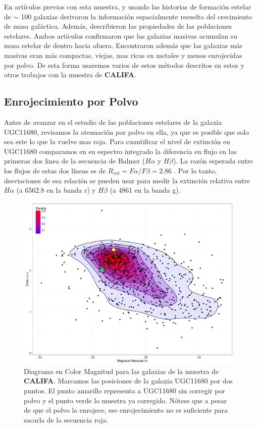 \noindent En artículos previos con esta muestra, y usando las historias de formación estelar de $\sim$ 100 galaxias \citep{perez2013} derivaron la información espacialmente resuelta del crecimiento de masa galáctica. Además, \citep{gonzalez2014} describieron  las propiedades de las poblaciones estelares. Ambos artículos confirmaron que las galaxias masivas acumulan su masa estelar de dentro hacia afuera. Encontraron además que las galaxias más masivas eran más compactas, viejas, mas ricas en metales y menos enrojecidas por polvo.
De esta forma usaremos varios de estos métodos descritos en estos y otros trabajos con la muestra de \textbf{CALIFA}.

\subsection{Enrojecimiento por Polvo}

Antes de avanzar en el estudio de las poblaciones estelares de la galaxia UGC11680,
revisamos la atenuación por polvo en ella, ya que es posible
que solo sea este lo que la vuelve mas roja. Para cuantificar el nivel de
extinción en UGC11680 comparamos en su espectro integrado la diferencia en flujo en las primeras dos
linea de la secuencia de Balmer ($H\alpha$ y $H\beta$). La razón esperada entre los flujos de estas dos líneas
es de $R_{int}=F\alpha/F\beta=2.86$ \citep{osterbrock1989}. Por lo tanto, desviaciones de esa relación se pueden usar para medir
la extinción relativa entre $H\alpha$ (a 6562.8 \text{\AA} en la banda r) y $H\beta$ (a 4861 \text{\AA} en la banda g).

\begin{figure}
  \centering
    \includegraphics[scale=0.5]{color_magnitud_ur.pdf}
  \caption[Diagrama Color-Magnitud con UGC11680]{Diagrama en Color Magnitud para las galaxias de la muestra de  \textbf{CALIFA}. Marcamos las posiciones de la galaxia UGC11680 por dos puntos. El punto amarillo representa a UGC11680 sin corregir por polvo y el punto verde lo muestra ya corregido. Nótese que a pesar de que el polvo la enrojece, ese enrojecimiento no es suficiente para sacarla de la secuencia roja.}
  \label{cmd1}
\end{figure}


